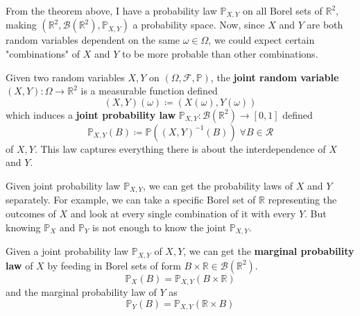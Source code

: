 \documentclass{article}
\begin{document}
    From the theorem above, I have a probability law $\mathbb{P}_{X, Y}$ on all Borel sets of $\mathbb{R}^2$, making $(\mathbb{R}^2, \mathcal{B}(\mathbb{R}^2), \mathbb{P}_{X, Y})$ a probability space. Now, since $X$ and $Y$ are both random variables dependent on the same $\omega \in \Omega$, we could expect certain "combinations" of $X$ and $Y$ to be more probable than other combinations. 

    \begin{definition}
      Given two random variables $X, Y$ on $(\Omega, \mathcal{F}, \mathbb{P})$, the \textbf{joint random variable} $(X, Y): \Omega \longrightarrow \mathbb{R}^2$ is a measurable function defined 
      \begin{equation}
        (X, Y) (\omega) \coloneqq (X(\omega), Y(\omega))
      \end{equation}
      which induces a \textbf{joint probability law} $\mathbb{P}_{X, Y}: \mathcal{B}(\mathbb{R}^2) \longrightarrow [0, 1]$ defined 
      \begin{equation}
        \mathbb{P}_{X, Y}(B) \coloneqq \mathbb{P}((X, Y)^{-1}(B)) \; \forall B \in \mathcal{R}
      \end{equation}
      of $X, Y$. This law captures everything there is about the interdependence of $X$ and $Y$. 
    \end{definition}

    Given joint probability law $\mathbb{P}_{X, Y}$, we can get the probability laws of $X$ and $Y$ separately. For example, we can take a specific Borel set of $\mathbb{R}$ representing the outcomes of $X$ and look at every single combination of it with every $Y$. But knowing $\mathbb{P}_X$ and $\mathbb{P}_Y$ is not enough to know the joint $\mathbb{P}_{X, Y}$. 

    \begin{definition}
      Given a joint probability law $\mathbb{P}_{X, Y}$ of $X, Y$, we can get the \textbf{marginal probability law} of $X$ by feeding in Borel sets of form $B \times \mathbb{R} \in \mathcal{B}(\mathbb{R}^2)$. 
      \begin{equation}
        \mathbb{P}_X (B) = \mathbb{P}_{X, Y} (B \times \mathbb{R})
      \end{equation}
      and the marginal probability law of $Y$ as 
      \begin{equation}
        \mathbb{P}_Y (B) = \mathbb{P}_{X, Y} (\mathbb{R} \times B)
      \end{equation}
    \end{definition}
\end{document}
